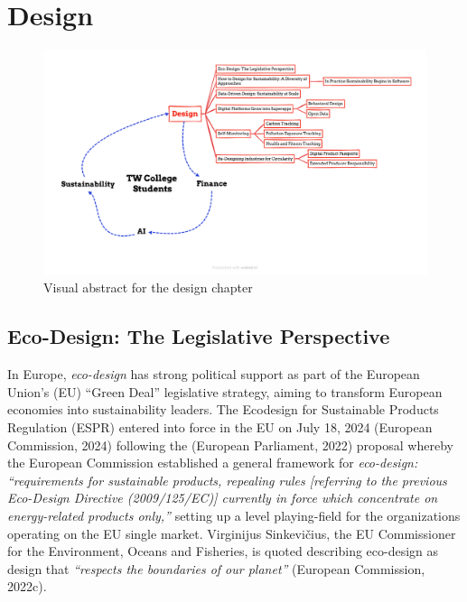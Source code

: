\documentclass[
  letterpaper,
  DIV=11,
  numbers=noendperiod]{scrartcl}
\begin{document}
\newpage

\section{Design}\label{design}

\begin{figure}[H]

{\centering \includegraphics{./images/design/abstract-design.png}

}

\caption{Visual abstract for the design chapter}

\end{figure}%

\subsection{Eco-Design: The Legislative
Perspective}\label{eco-design-the-legislative-perspective}

In Europe, \emph{eco-design} has strong political support as part of the
European Union's (EU) ``Green Deal'' legislative strategy, aiming to
transform European economies into sustainability leaders. The Ecodesign
for Sustainable Products Regulation (ESPR) entered into force in the EU
on July 18, 2024 (European Commission, 2024) following the (European
Parliament, 2022) proposal whereby the European Commission established a
general framework for \emph{eco-design: ``requirements for sustainable
products, repealing rules {[}referring to the previous Eco-Design
Directive (2009/125/EC){]} currently in force which concentrate on
energy-related products only,''} setting up a level playing-field for
the organizations operating on the EU single market. Virginijus
Sinkevičius, the EU Commissioner for the Environment, Oceans and
Fisheries, is quoted describing eco-design as design that
\emph{``respects the boundaries of our planet''} (European Commission,
2022c).
\end{document}
